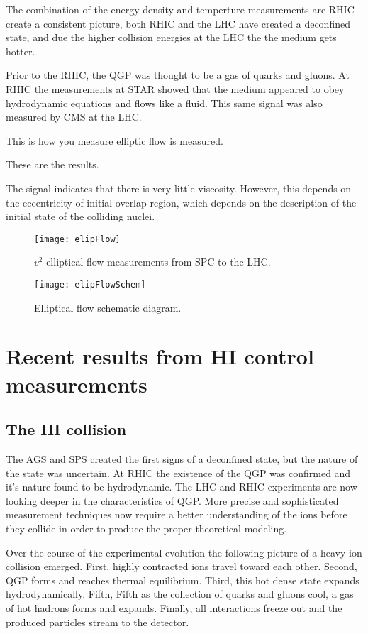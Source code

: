     The combination of the energy density and temperture measurements are RHIC
      create a consistent picture, both RHIC and the LHC have created a 
      deconfined state, and due the higher collision energies at the LHC the 
      the medium gets hotter. 
    
    Prior to the RHIC, the QGP was thought to be a gas of quarks and gluons.
    At RHIC the measurements at STAR showed that the medium appeared to obey 
      hydrodynamic equations and flows like a fluid.
    This same signal was also measured by CMS at the LHC. 

    This is how you measure elliptic flow is measured.

    These are the results. 

    The signal indicates that there is very little viscosity. 
    However, this depends on the eccentricity of initial overlap region, which
      depends on the description of the initial state of the colliding nuclei.

    \begin{figure}[!Hhbt]
      \centering
      \texttt{[image: elipFlow]}
      \caption{ $v^{2}$ elliptical flow measurements from SPC to the LHC.}
      \label{fig:elipFlow}
    \end{figure}

     \begin{figure}[!Hhbt]
      \centering
      \texttt{[image: elipFlowSchem]}
      \caption{ Elliptical flow schematic diagram.}
      \label{fig:elipFlowSchem}
    \end{figure}

  \section{Recent results from HI control measurements}

    \subsection{The HI collision}
      The AGS and SPS created the first signs of a deconfined state, but the 
        nature of the state was uncertain.
      At RHIC the existence of the QGP was confirmed and it's nature found to 
        be hydrodynamic.
      The LHC and RHIC experiments are now looking deeper in the characteristics
        of QGP.
      More precise and sophisticated measurement techniques now require a 
        better understanding of the ions before they collide in order to 
        produce the proper theoretical modeling. 

      Over the course of the experimental evolution the following picture of 
        a heavy ion collision emerged. 
      First, highly contracted ions travel toward each other.
      Second, QGP forms and reaches thermal equilibrium.
      Third, this hot dense state expands hydrodynamically.
      Fifth, Fifth as the collection of quarks and gluons cool, a gas of hot
        hadrons forms and expands.
      Finally, all interactions freeze out and the produced particles stream 
        to the detector. 
